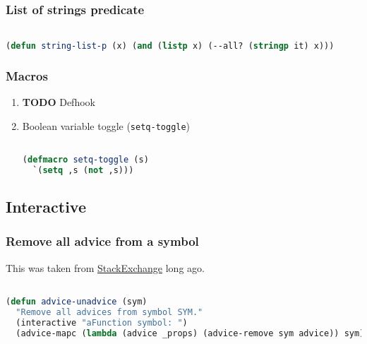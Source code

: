 \documentclass[11pt]{article}
\begin{document}
\subsubsection{List of strings predicate}
\label{sec:list-of-strings-predicate}
\begin{lstlisting}[language=Lisp]%! Someone please complete this list for me

(defun string-list-p (x) (and (listp x) (--all? (stringp it) x)))
\end{lstlisting}

\subsubsection{Macros}
\label{sec:macros}


\begin{enumerate}
  \item {\bfseries\sffamily TODO} Defhook
  \label{sec:defhook}

  
  \item Boolean variable toggle (\lstinline|setq-toggle|)
  \label{sec:boolean-variable-toggle-setq-toggle}

  \begin{lstlisting}[language=Lisp]%! Someone please complete this list for me

(defmacro setq-toggle (s)
  `(setq ,s (not ,s)))
\end{lstlisting}
\end{enumerate}


\subsection{Interactive}
\label{sec:interactive}


\subsubsection{Remove all advice from a symbol}
\label{sec:remove-all-advice-from-a-symbol}
This was taken from \href{https://emacs.stackexchange.com/a/24658}{StackExchange} long ago.

\begin{lstlisting}[language=Lisp]%! Someone please complete this list for me

(defun advice-unadvice (sym)
  "Remove all advices from symbol SYM."
  (interactive "aFunction symbol: ")
  (advice-mapc (lambda (advice _props) (advice-remove sym advice)) sym))
\end{lstlisting}
\end{document}
